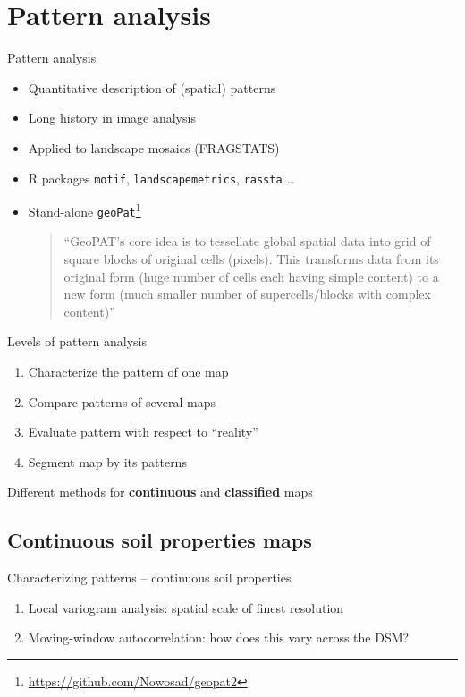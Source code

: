 \documentclass[aspectratio=169]{beamer}
\begin{document}
\section{Pattern analysis}

\begin{frame}{Pattern analysis}
    \begin{itemize}
        \item Quantitative description of (spatial) patterns
        \item Long history in image analysis
        \item Applied to landscape mosaics (FRAGSTATS)
        \item R packages  \texttt{motif}, \texttt{landscapemetrics}, \texttt{rassta} \ldots
        \item Stand-alone \texttt{geoPat}\footnote{\url{https://github.com/Nowosad/geopat2}}
\begin{quote}
\scriptsize
    ``GeoPAT’s core idea is to tessellate global spatial data into grid of square blocks of original cells (pixels). This transforms data from its original form (huge number of cells each having simple content) to a new form (much smaller number of supercells/blocks with complex content)''
\end{quote}
   \end{itemize}
\end{frame}

\begin{frame}{Levels of pattern analysis}
\begin{enumerate}
    \item Characterize the pattern of one map
    \item Compare patterns of several maps
    \item Evaluate pattern with respect to ``reality''
    \item Segment map by its patterns
\end{enumerate}
\vspace{2ex}
Different methods for \textbf{continuous} and \textbf{classified} maps
\end{frame}

\subsection{Continuous soil properties maps}

\begin{frame}{Characterizing patterns -- continuous soil properties}
    \begin{enumerate}
        \item Local variogram analysis: spatial scale of finest resolution
        \item Moving-window autocorrelation: how does this vary across the DSM?
    \end{enumerate}
\end{frame}
\end{document}
